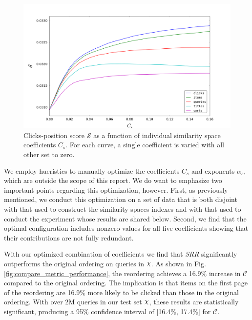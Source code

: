 \documentclass{article}
\def\Chi{\raisebox{2pt}{$\chi$}}
\begin{document}
\begin{figure}[htbp!]
    \centering
    \includegraphics[width=\textwidth]{000050_0_48chunk_k100_i2_n100_avg_click_position_score_0-0_16.png}
    \caption{Clicks-position score $\mathscr{S}$ as a function of individual similarity space coefficients $C_s$. For each curve, a single coefficient is varied with all other set to zero.}
    \label{fig:avg_clicks_position_score}
\end{figure}

We employ hueristics to manually optimize the coefficients $C_s$ and exponents
$\alpha_s$, which are outside the scope of this report. We do want to emphasize
two important points regarding this optimization, however. First, as previously
mentioned, we conduct this optimization on a set of data that is both disjoint
with that used to construct the similarity spaces indexes and with that used to
conduct the experiment whose results are shared below. Second, we find that the
optimal configuration includes nonzero values for all five coefficients showing
that their contributions are not fully redundant.

With our optimized combination of coefficients we find that {\em SRR}
significantly outperforms the original ordering on queries in $\Chi$. As shown
in Fig.  \ref{fig:compare_metric_performance}, the reordering achieves a 16.9\%
increase in $\mathscr{C}$ compared to the original ordering. The implication is
that items on the first page of the reordering are 16.9\% more likely to be
clicked than those in the original ordering. With over 2M queries in our test set
$\Chi$, these results are statistically significant, producing a 95\%
confidence interval of [16.4\%, 17.4\%] for $\mathscr{C}$.
\end{document}
